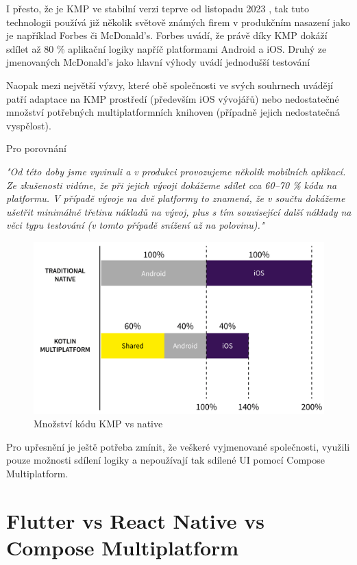 I přesto, že je KMP ve stabilní verzi teprve od listopadu 2023 \cite{KMPstable}, tak tuto technologii používá již několik světově 
známých firem v produkčním nasazení jako je například Forbes či McDonald's. Forbes uvádí, že právě díky KMP dokáží sdílet až 80 \%
aplikační logiky napříč platformami Android a iOS. \cite{KMPinForbes} 
Druhý ze jmenovaných McDonald's jako hlavní výhody uvádí jednodušší testování \cite{KMPinMcDonalds}

Naopak mezi největší výzvy, které obě společnosti ve svých souhrnech uvádějí patří adaptace na KMP prostředí (především iOS vývojářů) nebo
nedostatečné množství potřebných multiplatformních knihoven (případně jejich nedostatečná vyspělost). \cite{KMPinForbes} \cite{KMPinMcDonalds}

Pro porovnání 

\emph{"Od této doby jsme vyvinuli a v produkci provozujeme několik mobilních aplikací. Ze zkušenosti vidíme, že při jejich vývoji dokážeme sdílet cca 60–70 \% kódu na platformu. V případě vývoje na dvě platformy to znamená, že v součtu dokážeme ušetřit minimálně třetinu nákladů na vývoj, plus s tím související další náklady na věci typu testování (v tomto případě snížení až na polovinu)."}

\begin{figure}[H]
  \centering
  \includegraphics[width=.7\textwidth]{chart-KMP-vs-native.png}
  \caption{Množství kódu KMP vs native}
  \label{fig:KMP_vs_native}
\end{figure}

Pro upřesnění je ještě potřeba zmínit, že veškeré vyjmenované společnosti, využili pouze možnosti sdílení logiky a nepoužívají
tak sdílené UI pomocí Compose Multiplatform.

\section{Flutter vs React Native vs Compose Multiplatform}


